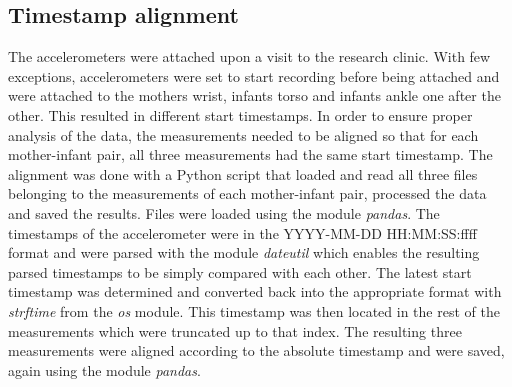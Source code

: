 \documentclass{article}
\begin{document}
{\subsection{Timestamp alignment}
The accelerometers were attached upon a visit to the research clinic. With few exceptions, accelerometers were set to start recording before being attached and were attached to the mothers wrist, infants torso and infants ankle one after the other. This resulted in different start timestamps. In order to ensure proper analysis of the data, the measurements needed to be aligned so that for each mother-infant pair, all three measurements had the same start timestamp.
The alignment was done with a Python script that loaded and read all three files belonging to the measurements of each mother-infant pair, processed the data and saved the results. Files were loaded using the module \textit{pandas}. The timestamps of the accelerometer were in the YYYY-MM-DD HH:MM:SS:ffff format and were parsed with the module \textit{dateutil} which enables the resulting parsed timestamps to be simply compared with each other. The latest start timestamp was determined and converted back into the appropriate format with \textit{strftime} from the \textit{os} module. This timestamp was then located in the rest of the measurements which were truncated up to that index. The resulting three measurements were aligned according to the absolute timestamp and were saved, again using the module \textit{pandas}. 

}
\end{document}
